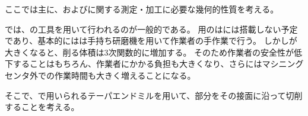 

ここでは主に、\textbf{\EndFaceOutRChamfer}および\textbf{\EndFaceInRChamfer}に関する測定・加工に必要な幾何的性質を考える。

\EndFaceRChamferMilling では、\BallEndMill の工具を用いて行われるのが一般的である。
\EndFaceChamferMilling 用の\BallEndMill は\DMC には搭載しない予定であり、基本的には\EndFaceRChamfer は手持ち研磨機を用いて作業者の手作業で行う。
しかし\EndFaceChamferLength が大きくなると、削る体積は3次関数的に増加する。
そのため作業者の安全性が低下することはもちろん、作業者にかかる負担も大きくなり、さらにはマシニングセンタ外での作業時間も大きく増えることになる。

そこで、\EndFaceCChamferMilling で用いられるテーパエンドミルを用いて、\EndFaceRChamfer 部分をその接面に沿って切削することを考える。



